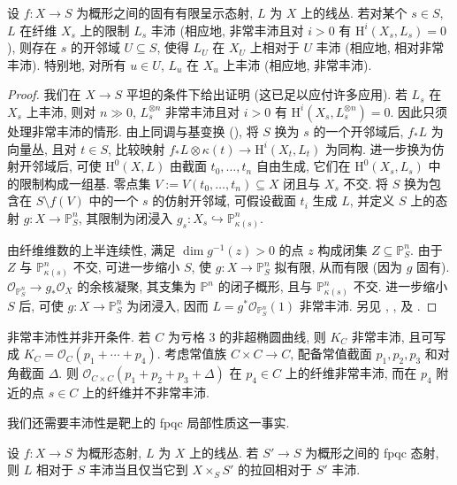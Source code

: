 \begin{proposition}[丰沛性的开放性]\label{src:B.2.10}
设 $f:X\to S$ 为概形之间的固有有限呈示态射, $L$ 为 $X$ 上的线丛. 若对某个 $s\in S$, $L$ 在纤维 $X_s$ 上的限制 $L_s$ 丰沛 (相应地, 非常丰沛且对 $i>0$ 有 $\mathrm H^i(X_s,L_s)=0$), 则存在 $s$ 的开邻域 $U\subseteq S$, 使得 $L_U$ 在 $X_U$ 上相对于 $U$ 丰沛 (相应地, 相对非常丰沛). 特别地, 对所有 $u\in U$, $L_u$ 在 $X_u$ 上丰沛 (相应地, 非常丰沛).
\end{proposition}
\begin{proof}
我们在 $X\to S$ 平坦的条件下给出证明 (这已足以应付许多应用). 若 $L_s$ 在 $X_s$ 上丰沛, 则对 $n\gg0$, $L_s^{\otimes n}$ 非常丰沛且对 $i>0$ 有 $\mathrm H^i(X_s,L_s^{\otimes n})=0$. 因此只须处理非常丰沛的情形. 由上同调与基变换 (), 将 $S$ 换为 $s$ 的一个开邻域后, $f_*L$ 为向量丛, 且对 $t\in S$, 比较映射 $f_*L\otimes\kappa(t)\to\mathrm H^i(X_t,L_t)$ 为同构. 进一步换为仿射开邻域后, 可使 $\mathrm H^0(X,L)$ 由截面 $t_0,\ldots,t_n$ 自由生成, 它们在 $\mathrm H^0(X_s,L_s)$ 中的限制构成一组基. 零点集 $V:=V(t_0,\ldots,t_n)\subseteq X$ 闭且与 $X_s$ 不交. 将 $S$ 换为包含在 $S\setminus f(V)$ 中的一个 $s$ 的仿射开邻域, 可假设截面 $t_i$ 生成 $L$, 并定义 $S$ 上的态射 $g:X\to\mathbb P^n_S$, 其限制为闭浸入 $g_s:X_s\hookrightarrow\mathbb P^n_{\kappa(s)}$.

由纤维维数的上半连续性, 满足 $\dim g^{-1}(z)>0$ 的点 $z$ 构成闭集 $Z\subseteq\mathbb P^n_S$. 由于 $Z$ 与 $\mathbb P^n_{\kappa(s)}$ 不交, 可进一步缩小 $S$, 使 $g:X\to\mathbb P^n_S$ 拟有限, 从而有限 (因为 $g$ 固有). $\mathcal O_{\mathbb P^n_S}\to g_*\mathcal O_X$ 的余核凝聚, 其支集为 $\mathbb P^n$ 的闭子概形, 且与 $\mathbb P^n_{\kappa(s)}$ 不交. 进一步缩小 $S$ 后, 可使 $g:X\to\mathbb P^n_S$ 为闭浸入, 因而 $L=g^*\mathcal O_{\mathbb P^n_S}(1)$ 非常丰沛. 另见 \cite[定理 $1.2.17$, 定理 $1.7.8$]{Laz04a}, \cite[III$_1$.$4.7.1$, IV$_3$.$9.6.4$]{EGA}, \cite[命题 $1.41$]{KM98} 及 \cite[Tag 0D3D]{SP}.
\end{proof}
\begin{example}\label{src:B.2.11}
非常丰沛性并非开条件. 若 $C$ 为亏格 $3$ 的非超椭圆曲线, 则 $K_C$ 非常丰沛, 且可写成 $K_C=\mathcal O_C(p_1+\cdots+p_4)$. 考虑常值族 $C\times C\to C$, 配备常值截面 $p_1,p_2,p_3$ 和对角截面 $\Delta$. 则 $\mathcal O_{C\times C}(p_1+p_2+p_3+\Delta)$ 在 $p_4\in C$ 上的纤维非常丰沛, 而在 $p_4$ 附近的点 $s\in C$ 上的纤维并不非常丰沛.
\end{example}
我们还需要丰沛性是靶上的 fpqc 局部性质这一事实.
\begin{proposition}\label{src:B.2.12}
设 $f:X\to S$ 为概形态射, $L$ 为 $X$ 上的线丛. 若 $S'\to S$ 为概形之间的 fpqc 态射, 则 $L$ 相对于 $S$ 丰沛当且仅当它到 $X\times_S S'$ 的拉回相对于 $S'$ 丰沛.
\end{proposition}
